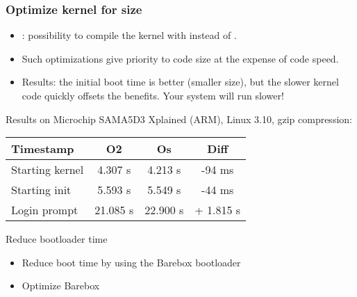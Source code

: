 \begin{frame}
\frametitle{Optimize kernel for size}
\begin{itemize}
\item {}: possibility to compile the kernel
      with  instead of .
\item Such optimizations give priority to code size at
      the expense of code speed.
\item Results: the initial boot time is better (smaller
      size), but the slower kernel code quickly offsets
      the benefits. Your system will run slower!
\end{itemize}
Results on Microchip SAMA5D3 Xplained (ARM), Linux 3.10, gzip compression:
\newline\newline
\begin{tabular}{| l || c | c | c |}
\hline
Timestamp & O2 & Os & Diff \\
\hline
Starting kernel & 4.307 s & 4.213 s & -94 ms \\
Starting init & 5.593 s & 5.549 s & -44 ms \\
Login prompt & 21.085 s & 22.900 s & + 1.815 s \\
\hline
\end{tabular}
\newline\newline
\small
\end{frame}

\setuplabframe
{Reduce bootloader time}
{
\begin{itemize}
\item Reduce boot time by using the Barebox bootloader
\item Optimize Barebox
\end{itemize}
}

